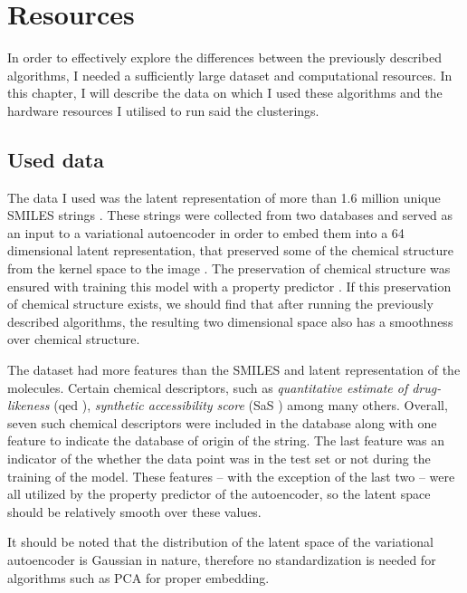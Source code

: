 \chapter{Resources}\label{ch:resources}

In order to effectively explore the differences between the previously described algorithms, I needed a sufficiently large dataset and computational resources. In this chapter, I will describe the data on which I used these algorithms and the hardware resources I utilised to run said the clusterings.

\section{Used data}\label{sec:used-data}

The data I used was the latent representation of more than 1.6 million unique SMILES strings \cite{bib:smiles}. These strings were collected from two databases and served as an input to a variational autoencoder \cite{bib:vae} in order to embed them into a 64 dimensional latent representation, that preserved some of the chemical structure from the kernel space to the image \cite{bib:thesis}. The preservation of chemical structure was ensured with training this model with a property predictor \cite{bib:prop_pred}. If this preservation of chemical structure exists, we should find that after running the previously described algorithms, the resulting two dimensional space also has a smoothness over chemical structure.

The dataset had more features than the SMILES and latent representation of the molecules. Certain chemical descriptors, such as \textit{quantitative estimate of drug-likeness} (qed \cite{bib:qed}), \textit{synthetic accessibility score} (SaS \cite{bib:sas}) among many others. Overall, seven such chemical descriptors were included in the database along with one feature to indicate the database of origin of the string. The last feature was an indicator of the whether the data point was in the test set or not during the training of the model. These features -- with the exception of the last two -- were all utilized by the property predictor of the autoencoder, so the latent space should be relatively smooth over these values.

It should be noted that the distribution of the latent space of the variational autoencoder is Gaussian in nature, therefore no standardization is needed for algorithms such as PCA for proper embedding.

